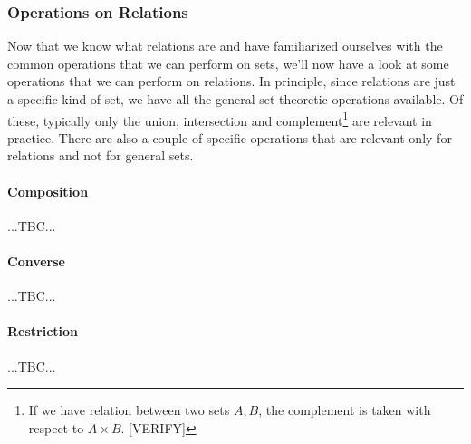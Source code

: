 \subsubsection{Operations on Relations}
Now that we know what relations are and have familiarized ourselves with the common operations that we can perform on sets, we'll now have a look at some operations that we can perform on relations. In principle, since relations are just a specific kind of set, we have all the general set theoretic operations available. Of these, typically only the union, intersection and complement\footnote{If we have relation between two sets $A,B$, the complement is taken with respect to $A \times B$. [VERIFY]} are relevant in practice. There are also a couple of specific operations that are relevant only for relations and not for general sets.

\paragraph{Composition}
...TBC...

\paragraph{Converse}
...TBC...

\paragraph{Restriction}
...TBC...






